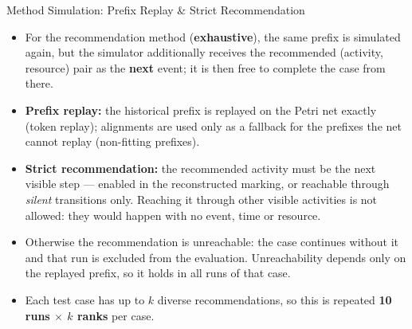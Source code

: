 \documentclass[aspectratio=169]{beamer} %
\begin{document}
\begin{frame}{Method Simulation: Prefix Replay \& Strict Recommendation}
  \footnotesize
    \begin{itemize}
        \item For the recommendation method (\textbf{exhaustive}), the same prefix is simulated again, but the simulator additionally receives the recommended (activity, resource) pair as the \textbf{next} event; it is then free to complete the case from there.
        \item \textbf{Prefix replay:} the historical prefix is replayed on the Petri net
          \alert{exactly} (token replay); alignments are used only as a fallback for the
          prefixes the net cannot replay (non-fitting prefixes).
        \item \textbf{Strict recommendation:} the recommended activity must be the
          \alert{next visible step} --- enabled in the reconstructed marking, or reachable
          through \emph{silent} transitions only. Reaching it through other visible
          activities is not allowed: they would happen with no event, time or resource.
        \item Otherwise the recommendation is \alert{unreachable}: the case continues
          without it and that run is excluded from the evaluation. Unreachability depends
          only on the replayed prefix, so it holds in all runs of that case.
        \item Each test case has up to $k$ diverse recommendations, so this is repeated
          \textbf{10 runs $\times$ $k$ ranks} per case.
    \end{itemize}
\end{frame}
\end{document}
